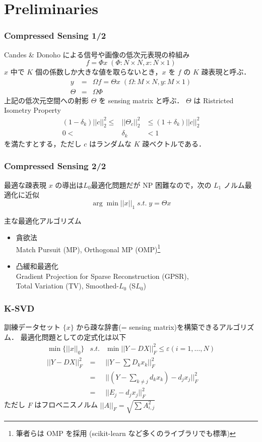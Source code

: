 \section{Preliminaries}
\begin{frame}\frametitle{Compressed Sensing 1/2}
Candes \& Donoho による信号や画像の低次元表現の枠組み
\begin{equation}
    f = \Phi x \; (\Phi: N \times N, x: N \times 1)
\end{equation}
$x$ 中で $K$ 個の係数しか大きな値を取らないとき，$x$ を $f$ の $K$ 疎表現と呼ぶ．
\begin{eqnarray}
    y & = & \Omega f = \Theta x \; (\Omega: M \times N, y: M \times 1) \\
    \Theta & = & \Omega \Phi
\end{eqnarray}
上記の低次元空間への射影 $\Theta$ を sensing matrix と呼ぶ．
$\Theta$ は Ristricted Isometry Property
\begin{eqnarray}
    (1 - \delta_k) ||c||^2_2 \leq & || \Theta_c ||^2_2 & \leq (1 + \delta_k) ||c||^2_2 \\
    0 < & \delta_k & < 1
\end{eqnarray}
を満たすとする，ただし $c$ はランダムな $K$ 疎ベクトルである．
\end{frame}


\begin{frame}\frametitle{Compressed Sensing 2/2}
最適な疎表現 $x$ の導出は$L_0$最適化問題だが NP 困難なので，次の $L_1$ ノルム最適化に近似
\begin{equation}
    \arg\min ||x||_1 \; s.t. \; y = \Theta x
\end{equation}
\begin{block}{主な最適化アルゴリズム}
\begin{itemize}
    \item 貪欲法\\
        Match Pursuit (MP),
        Orthogonal MP (OMP)\footnote{筆者らは OMP を採用 (scikit-learn など多くのライブラリでも標準)}

    \item 凸緩和最適化\\
        Gradient Projection for Sparse Reconstruction (GPSR),\\
        Total Variation (TV),
        Smoothed-$L_0$ (S$L_0$)
\end{itemize}
\end{block}
\end{frame}


\begin{frame}\frametitle{K-SVD}
訓練データセット $\{ x \}$ から疎な辞書(= sensing matrix)を構築できるアルゴリズム．
最適化問題としての定式化は以下
\begin{eqnarray}
    \min \{||x||_0\} &s.t.& \min ||Y-DX||^2_F \leq \varepsilon (i = 1, \dots, N) \\
    ||Y-DX||^2_F &=& ||Y - \sum D_k x_k||^2_F \\
    &=& ||(Y - \sum_{k \neq j} d_k x_k) - d_j x_j||^2_F \\
    &=& ||E_j - d_j x_j||^2_F
\end{eqnarray}
ただし $F$ はフロベニスノルム $||A||_F = \sqrt{\sum{A^2_{i,j}}}$
\end{frame}
